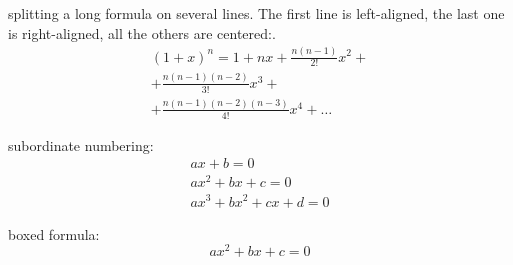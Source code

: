 \documentclass[a5paper,12pt]{article}
\begin{document}
splitting a long formula on several lines. The first line is left-aligned, the last one is right-aligned, all the others are centered:.
\begin{multline}
\left(1+x\right)^n  = 1 + nx + \frac{n\left(n-1\right)}{2!}x^2 +\\
+ \frac{n\left(n-1\right)\left(n-2\right)}{3!}x^3 +\\
+ \frac{n\left(n-1\right)\left(n-2\right)\left(n-3\right)}{4!}x^4 + \dots
\end{multline}

subordinate numbering:
\begin{subequations}
\begin{gather}
a x + b = 0 \\
a x^2 + b x + c = 0 \\
a x^3 + b x^2 + c x + d = 0
\end{gather}
\end{subequations}

boxed formula:
\begin{equation*}
\boxed{a x^2 + b x + c = 0}
\end{equation*}
\end{document}
